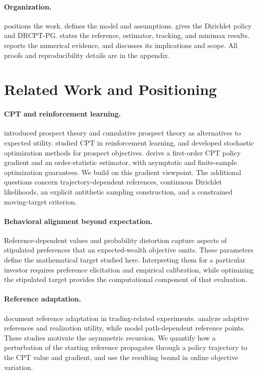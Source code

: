 \documentclass[11pt]{article}
\newcommand{\1}{\mathbf 1}
\newcommand{\CPT}{\ensuremath{\mathrm{CPT}}\xspace}
\newcommand{\DRCPTPG}{\ensuremath{\mathrm{DRCPT\mbox{-}PG}}\xspace}
\begin{document}
\paragraph{Organization.}
 positions the work.  defines the model and assumptions.  gives the Dirichlet policy and \DRCPTPG.  states the reference, estimator, tracking, and minimax results.  reports the numerical evidence, and  discusses its implications and scope. All proofs and reproducibility details are in the appendix.


\section{Related Work and Positioning}\label{sec:related}

\paragraph{CPT and reinforcement learning.}
\citet{kahneman1979prospect,tversky1992advances} introduced prospect theory and cumulative prospect theory as alternatives to expected utility. \citet{prashanth2016cumulative} studied \CPT in reinforcement learning, and \citet{jie2018stochastic} developed stochastic optimization methods for prospect objectives. \citet{lepel2024policygradients} derive a first-order \CPT policy gradient and an order-statistic estimator, with asymptotic and finite-sample optimization guarantees. We build on this gradient viewpoint. The additional questions concern trajectory-dependent references, continuous Dirichlet likelihoods, an explicit antithetic sampling construction, and a constrained moving-target criterion.

\paragraph{Behavioral alignment beyond expectation.}
Reference-dependent values and probability distortion capture aspects of stipulated preferences that an expected-wealth objective omits. These parameters define the mathematical target studied here. Interpreting them for a particular investor requires preference elicitation and empirical calibration, while optimizing the stipulated target provides the computational component of that evaluation.

\paragraph{Reference adaptation.}
\citet{arkes2008reference,arkes2010cross} document reference adaptation in trading-related experiments. \citet{he2019realization} analyze adaptive references and realization utility, while \citet{qin2022realization} model path-dependent reference points. These studies motivate the asymmetric recursion. We quantify how a perturbation of the starting reference propagates through a policy trajectory to the \CPT value and gradient, and use the resulting bound in online objective variation.
\end{document}
